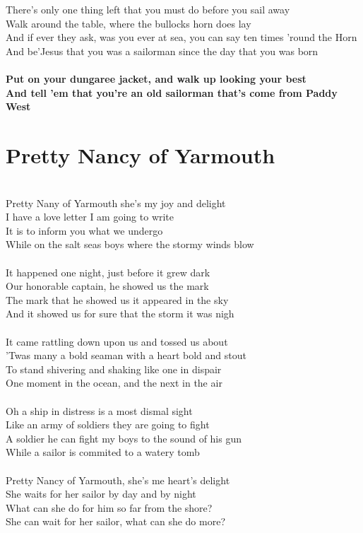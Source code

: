 \documentclass[letterpaper,9pt]{article}
\begin{document}
\\
\\There's only one thing left that you must do before you sail away
\\Walk around the table, where the bullocks horn does lay
\\And if ever they ask, was you ever at sea, you can say ten times 'round the Horn
\\And be'Jesus that you was a sailorman since the day that you was born
\\
\\\textbf{Put on your dungaree jacket, and walk up looking your best
\\And tell 'em that you're an old sailorman that's come from Paddy West}

\newpage
\section{Pretty Nancy of Yarmouth}
\LARGE
\noindent
\\Pretty Nany of Yarmouth she's my joy and delight
\\I have a love letter I am going to write
\\It is to inform you what we undergo
\\While on the salt seas boys where the stormy winds blow
\\
\\It happened one night, just before it grew dark
\\Our honorable captain, he showed us the mark
\\The mark that he showed us it appeared in the sky
\\And it showed us for sure that the storm it was nigh
\\
\\It came rattling down upon us and tossed us about
\\'Twas many a bold seaman with a heart bold and stout
\\To stand shivering and shaking like one in dispair
\\One moment in the ocean, and the next in the air
\\
\\Oh a ship in distress is a most dismal sight
\\Like an army of soldiers they are going to fight
\\A soldier he can fight my boys to the sound of his gun
\\While a sailor is commited to a watery tomb
\\
\\Pretty Nancy of Yarmouth, she's me heart's delight
\\She waits for her sailor by day and by night
\\What can she do for him so far from the shore?
\\She can wait for her sailor, what can she do more?
\end{document}
